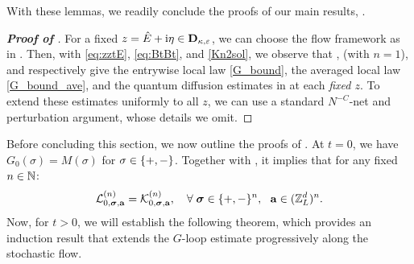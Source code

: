 With these lemmas, we readily conclude the proofs of our main results, .
\begin{proof}[\bf Proof of ]
For a fixed $z=\hat{E}+\mathrm{i} \eta\in \mathbf D_{\kappa,{\varepsilon}}$, we can choose the flow framework as in . 
Then, with \eqref{eq:zztE}, \eqref{eq:BtBt}, and \eqref{Kn2sol}, we observe that ,  (with $n=1$), and  respectively give the entrywise local law \eqref{G_bound}, the averaged local law \eqref{G_bound_ave}, and the quantum diffusion estimates in  at each \emph{fixed $z$}. To extend these estimates uniformly to all $z$, we can use a standard $N^{-C}$-net and perturbation argument, whose details we omit. 
\end{proof}

 
 



Before concluding this section, we now outline the proofs of . At $t=0$, we have $G_{0}(\sigma)=M(\sigma)$ for $\sigma\in\{+,-\}$. Together with , it implies that for any fixed $n\in \mathbb{N}$:   
$${\cL}^{(n)}_{0, \bsig,\ba}= {\cK}^{(n)}_{0, \bsig,\ba},\quad \forall \; \bsig\in \{+,-\}^n,\ \ \ba\in (\Zn)^n. 
$$
Now, for $t>0$, we will establish the following theorem, which provides an induction result that extends the $G$-loop estimate progressively along the stochastic flow.



